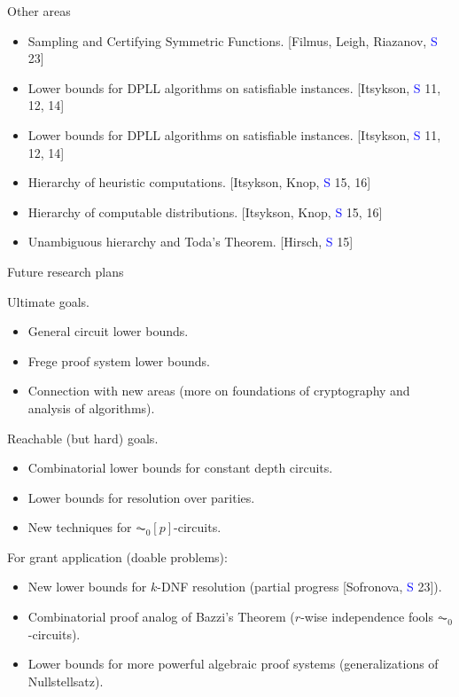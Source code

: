 \begin{frame}{Other areas}

    \begin{itemize}
        \item Sampling and Certifying Symmetric Functions. [Filmus, Leigh, Riazanov, \textcolor{blue}{S} 23]
        \item Lower bounds for DPLL algorithms on satisfiable instances. [Itsykson, \textcolor{blue}{S} 11, 12, 14]
        \item Lower bounds for DPLL algorithms on satisfiable instances. [Itsykson, \textcolor{blue}{S} 11, 12, 14]
        \item Hierarchy of heuristic computations. [Itsykson, Knop, \textcolor{blue}{S} 15, 16]
        \item Hierarchy of computable distributions. [Itsykson, Knop, \textcolor{blue}{S} 15, 16]
        \item Unambiguous hierarchy and Toda's Theorem. [Hirsch, \textcolor{blue}{S} 15]
    \end{itemize}
    
\end{frame}


\begin{frame}{Future research plans}

    Ultimate goals.
    \begin{itemize}
        \item General circuit lower bounds.
        \item Frege proof system lower bounds.
        \item Connection with new areas (more on foundations of cryptography and analysis of algorithms).
    \end{itemize}

    \pause
    Reachable (but hard) goals.
    \begin{itemize}
        \item Combinatorial lower bounds for constant depth circuits.
        \item Lower bounds for resolution over parities.
        \item New techniques for $\AC_0[p]$-circuits.
    \end{itemize}

    \pause 
    For grant application (doable problems):
    \begin{itemize}
        \item New lower bounds for $k$-DNF resolution (partial progress [Sofronova, \textcolor{blue}{S} 23]).
        \item Combinatorial proof analog of Bazzi's Theorem ($r$-wise independence fools
            $\AC_0$-circuits).
        \item Lower bounds for more powerful algebraic proof systems (generalizations of Nullstellsatz).
    \end{itemize}
    
\end{frame}


